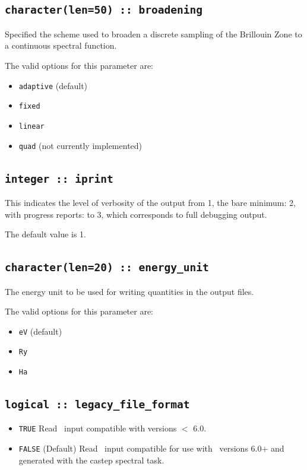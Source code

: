 \documentclass[a4paper,11pt,twoside]{book}
\begin{document}
{\subsection[broadening]{\tt character(len=50) :: broadening}

Specified the scheme used to broaden a discrete sampling of the
Brillouin Zone to a continuous spectral function.

The valid options for this parameter are:
\begin{itemize}
\item[{\bf --}]  \verb#adaptive# (default)
\item[{\bf --}]  \verb#fixed#
\item[{\bf --}]  \verb#linear#
\item[{\bf --}]  \verb#quad# (not currently implemented)
\end{itemize}

\subsection[iprint]{\tt integer :: iprint}

This indicates the level of verbosity of the output from 1,
the bare minimum: 2, with progress reports: to 3, which corresponds to full debugging output.

The default value is 1.


\subsection[energy\_unit]{\tt character(len=20) :: energy\_unit}
The energy unit to be used for writing quantities in the output files.

The valid options for this parameter are:
\begin{itemize}
\item[{\bf --}]  \verb#eV# (default)
\item[{\bf --}]  \verb#Ry#
\item[{\bf --}]  \verb#Ha#
\end{itemize}

\subsection[adaptive\_smearing]{\tt logical :: legacy\_file\_format}
\label{sect:lff}
\begin{itemize}
\item[{\bf --}] \verb#TRUE#  Read \castep\ input compatible with versions $<$ 6.0.
\item[{\bf --}] \verb#FALSE# (Default) Read \castep\ input compatible for use with \castep\ versions 6.0$+$ and generated with the castep spectral task.
\end{itemize}

}
\end{document}
